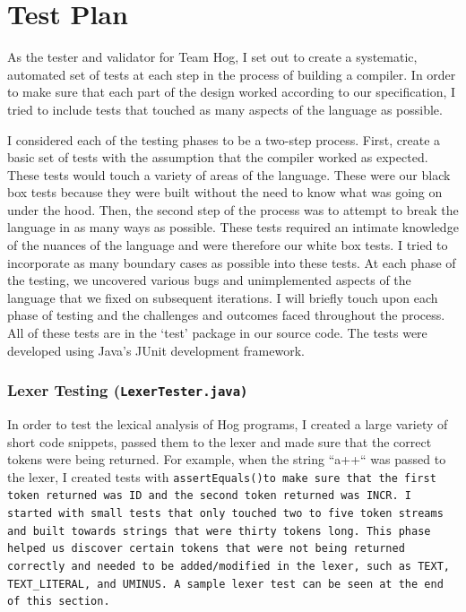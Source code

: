\documentclass{report}
\begin{document}
\begin{itemize}
\end{itemize}

\chapter{Test Plan}
\label{chap:test}

As the tester and validator for Team Hog, I set out to create a systematic, automated set of tests at each step in the process of building a compiler. In order to make sure that each part of the design worked according to our specification, I tried to include tests that touched as many aspects of the language as possible. 

I considered each of the testing phases to be a two-step process. First, create a basic set of tests with the assumption that the compiler worked as expected. These tests would touch a variety of areas of the language. These were our black box tests because they were built without the need to know what was going on under the hood. Then, the second step of the process was to attempt to break the language in as many ways as possible. These tests required an intimate knowledge of the nuances of the language and were therefore our white box tests. I tried to incorporate as many boundary cases as possible into these tests. At each phase of the testing, we uncovered various bugs and unimplemented aspects of the language that we fixed on subsequent iterations. I will briefly touch upon each phase of testing and the challenges and outcomes faced throughout the process. All of these tests are in the ‘test’ package in our source code. The tests were developed using Java’s JUnit development framework.

\subsection*{Lexer Testing (\tt LexerTester.java\rm)}
 
In order to test the lexical analysis of Hog programs, I created a large variety of short code snippets, passed them to the lexer and made sure that the correct tokens were being returned. For example, when the string ``a++`` was passed to the lexer, I created tests with \tt assertEquals()\rm to make sure that the first token returned was ID and the second token returned was INCR. I started with small tests that only touched two to five token streams and built towards strings that were thirty tokens long. This phase helped us discover certain tokens that were not being returned correctly and needed to be added/modified in the lexer, such as \tt TEXT\rm, \tt TEXT\_LITERAL\rm, and \tt UMINUS\rm. A sample lexer test can be seen at the end of this section.
\end{document}
